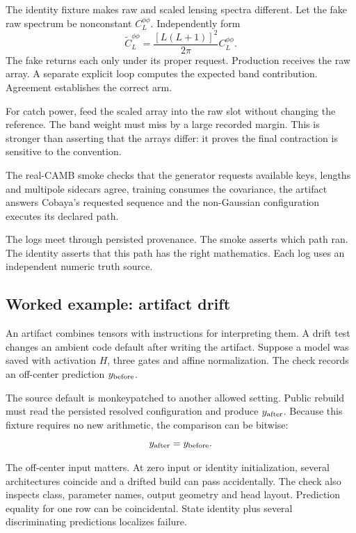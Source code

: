 The identity fixture makes raw and scaled lensing spectra different.  Let the
fake raw spectrum be nonconstant \(C_L^{\phi\phi}\).  Independently form
\begin{equation*}
 \widetilde C_L^{\phi\phi}
 =\frac{[L(L+1)]^2}{2\pi}C_L^{\phi\phi}.
\end{equation*}
The fake returns each only under its proper request.  Production receives the
raw array.  A separate explicit loop computes the expected band contribution.
Agreement establishes the correct arm.

For catch power, feed the scaled array into the raw slot without changing the
reference.  The band weight must miss by a large recorded margin.  This is
stronger than asserting that the arrays differ: it proves the final
contraction is sensitive to the convention.

The real-CAMB smoke checks that the generator requests available keys, lengths
and multipole sidecars agree, training consumes the covariance, the artifact
answers Cobaya's requested sequence and the non-Gaussian configuration
executes its declared path.

The logs meet through persisted provenance.  The smoke asserts which path
ran.  The identity asserts that this path has the right mathematics.  Each log
uses an independent numeric truth source.

\subsection{Worked example: artifact drift}

An artifact combines tensors with instructions for interpreting them.  A
drift test changes an ambient code default after writing the artifact.
Suppose a model was saved with activation \(H\), three gates and affine
normalization.  The check records an off-center prediction
\(y_{\rm before}\).

The source default is monkeypatched to another allowed setting.  Public
rebuild must read the persisted resolved configuration and produce
\(y_{\rm after}\).  Because this fixture requires no new arithmetic, the
comparison can be bitwise:
\begin{equation*}
  y_{\rm after}=y_{\rm before}.
\end{equation*}

The off-center input matters.  At zero input or identity initialization,
several architectures coincide and a drifted build can pass accidentally.
The check also inspects class, parameter names, output geometry and head
layout.  Prediction equality for one row can be coincidental.  State identity
plus several discriminating predictions localizes failure.

